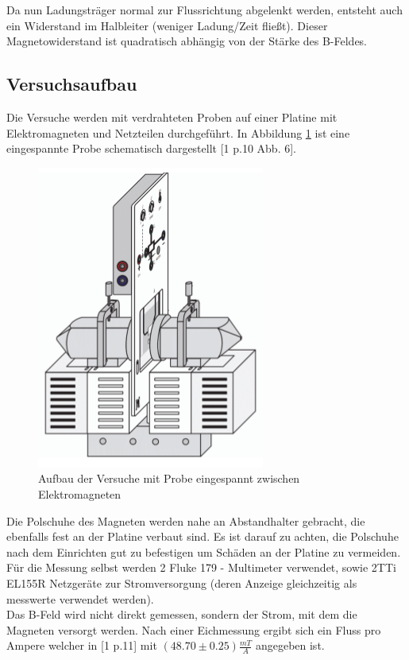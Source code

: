 \documentclass[12pt,a4paper]{article}
\begin{document}
\begin{multicols}{2}
Da nun Ladungsträger normal zur Flussrichtung abgelenkt werden, entsteht auch ein Widerstand im Halbleiter (weniger Ladung/Zeit fließt). Dieser Magnetowiderstand ist quadratisch abhängig von der Stärke des B-Feldes.


\pagebreak
\subsection{Versuchsaufbau}
Die Versuche werden mit verdrahteten Proben auf einer Platine mit Elektromagneten und Netzteilen durchgeführt. In Abbildung \ref{fig:probe_aufbau} ist eine eingespannte Probe schematisch dargestellt [1 p.10 Abb. 6].

\begin{figure}[H]
	\centering
	\includegraphics[scale=0.5]{./figures/aufbau_proben.png}
	\caption{Aufbau der Versuche mit Probe eingespannt zwischen Elektromagneten}
	\label{fig:probe_aufbau}
\end{figure}

Die Polschuhe des Magneten werden nahe an Abstandhalter gebracht, die ebenfalls fest an der Platine verbaut sind. Es ist darauf zu achten, die Polschuhe nach dem Einrichten gut zu befestigen um Schäden an der Platine zu vermeiden.\\

Für die Messung selbst werden 2 Fluke 179 - Multimeter verwendet, sowie 2TTi EL155R Netzgeräte zur Stromversorgung (deren Anzeige gleichzeitig als messwerte verwendet werden).\\

Das B-Feld wird nicht direkt gemessen, sondern der Strom, mit dem die Magneten versorgt werden.
Nach einer Eichmessung ergibt sich ein Fluss pro Ampere welcher in [1 p.11] mit 
$(48.70 \pm 0.25) \frac{mT}{A}$ 
angegeben ist.


\pagebreak
\end{multicols}
\end{document}
